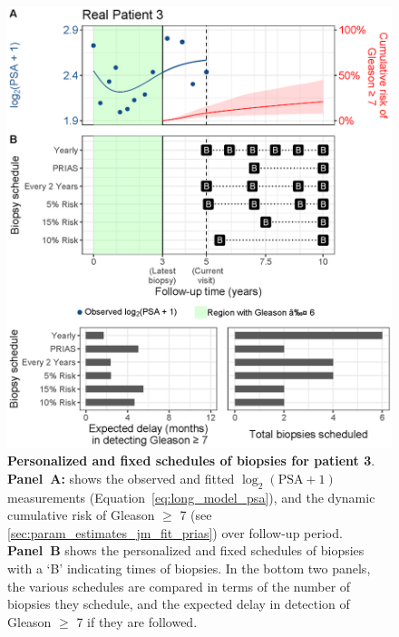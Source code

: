 \begin{figure}
\centerline{\includegraphics[width=\columnwidth]{images/demo_pat3_supp.eps}}
\caption{\textbf{Personalized and fixed schedules of biopsies for patient 3}. \textbf{Panel~A:} shows the observed and fitted $\log_2(\mbox{PSA} + 1)$ measurements (Equation~\ref{eq:long_model_psa}), and the dynamic cumulative risk of Gleason $\geq$ 7 (see \ref{sec:param_estimates_jm_fit_prias}) over follow-up period. \textbf{Panel~B} shows the personalized and fixed schedules of biopsies with a `B' indicating times of biopsies. In the bottom two panels, the various schedules are compared in terms of the number of biopsies they schedule, and the expected delay in detection of Gleason $\geq$ 7 if they are followed.}
\label{fig:demo_pat3_supp}
\end{figure}

